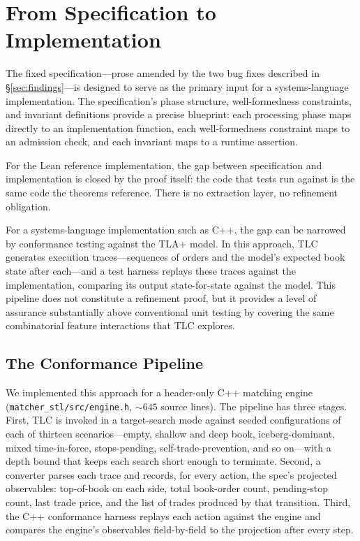 \documentclass[11pt,a4paper]{article}
\begin{document}
\section{From Specification to Implementation}
\label{sec:synthesis}

The fixed specification---prose amended by the two bug fixes described
in \S\ref{sec:findings}---is designed to serve as the primary input for
a systems-language implementation. The specification's phase structure,
well-formedness constraints, and invariant definitions provide a precise
blueprint: each processing phase maps directly to an implementation
function, each well-formedness constraint maps to an admission check,
and each invariant maps to a runtime assertion.

For the Lean reference implementation, the gap between specification and
implementation is closed by the proof itself: the code that tests run
against is the same code the theorems reference. There is no extraction
layer, no refinement obligation.

For a systems-language implementation such as C++, the gap can be
narrowed by conformance testing against the TLA+ model. In this
approach, TLC generates execution traces---sequences of orders and the
model's expected book state after each---and a test harness replays
these traces against the implementation, comparing its output
state-for-state against the model. This pipeline does not constitute a
refinement proof, but it provides a level of assurance substantially
above conventional unit testing by covering the same combinatorial
feature interactions that TLC explores.

\subsection{The Conformance Pipeline}
\label{sec:conformance-pipeline}

We implemented this approach for a header-only C++ matching engine
(\texttt{matcher\_stl/src/engine.h}, ${\sim}645$ source lines). The
pipeline has three stages. First, TLC is invoked in a target-search mode
against seeded configurations of each of thirteen scenarios---empty,
shallow and deep book, iceberg-dominant, mixed time-in-force,
stops-pending, self-trade-prevention, and so on---with a depth bound
that keeps each search short enough to terminate. Second, a
converter parses each trace and records, for every action, the
spec's projected observables: top-of-book on each side, total
book-order count, pending-stop count, last trade price, and the
list of trades produced by that transition. Third, the C++
conformance harness replays each action against the engine and
compares the engine's observables field-by-field to the projection
after every step.
\end{document}
